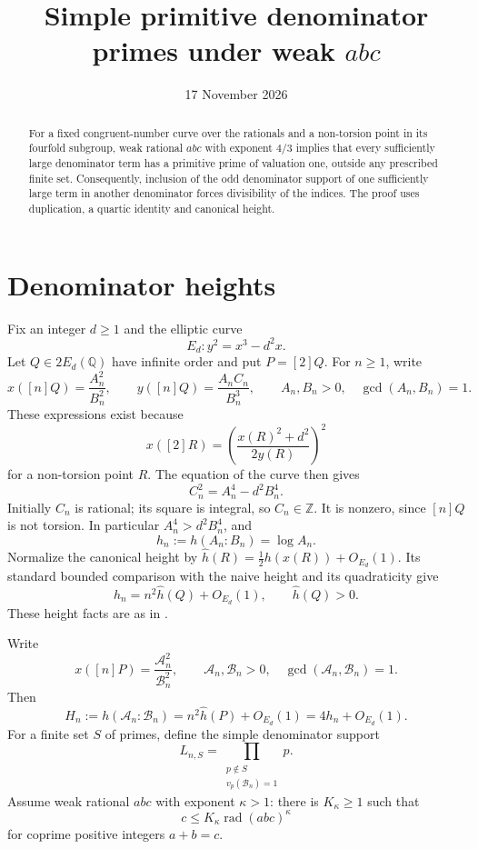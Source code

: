 \documentclass[11pt,a4paper]{article}
\title{Simple primitive denominator primes under weak \texorpdfstring{$abc$}{abc}}
\author{}\date{17 November 2026}
\newcommand{\Q}{\mathbb Q}\newcommand{\Z}{\mathbb Z}
\DeclareMathOperator{\rad}{rad}
\begin{document}
\maketitle

\begin{abstract}
For a fixed congruent-number curve over the rationals and a non-torsion
point in its fourfold subgroup, weak rational $abc$ with exponent $4/3$
implies that every sufficiently large denominator term has a primitive
prime of valuation one, outside any prescribed finite set.
Consequently, inclusion of the odd denominator support of one sufficiently
large term in another denominator forces divisibility of the indices.
The proof uses duplication, a quartic identity and canonical height.
\end{abstract}

\section{Denominator heights}

Fix an integer $d\ge1$ and the elliptic curve
\[
                       E_d:y^2=x^3-d^2x.
\]
Let $Q\in2E_d(\Q)$ have infinite order and put $P=[2]Q$.
For $n\ge1$, write
\begin{equation}\label{eq:coordinates}
 x([n]Q)=\frac{A_n^2}{B_n^2},\qquad
 y([n]Q)=\frac{A_n C_n}{B_n^3},\qquad
 A_n,B_n>0,\quad\gcd(A_n,B_n)=1.
\end{equation}
These expressions exist because
\[
 x([2]R)=\left(\frac{x(R)^2+d^2}{2y(R)}\right)^2
\]
for a non-torsion point $R$. The equation of the curve then gives
\begin{equation}\label{eq:quartic}
                         C_n^2=A_n^4-d^2B_n^4.
\end{equation}
Initially $C_n$ is rational; its square is integral, so $C_n\in\Z$.
It is nonzero, since $[n]Q$ is not torsion. In particular
$A_n^4>d^2B_n^4$, and
\[
                  h_n:=h(A_n:B_n)=\log A_n.
\]
Normalize the canonical height by
$\widehat h(R)=\tfrac12h(x(R))+O_{E_d}(1)$. Its standard bounded
comparison with the naive height and its quadraticity give
\begin{equation}\label{eq:canonical}
              h_n=n^2\widehat h(Q)+O_{E_d}(1),\qquad
                         \widehat h(Q)>0.
\end{equation}
These height facts are as in \cite[Chapter VIII, Section 9]{AEC}.

Write
\[
 x([n]P)=\frac{\mathcal A_n^2}{\mathcal B_n^2},\qquad
 \mathcal A_n,\mathcal B_n>0,\quad
 \gcd(\mathcal A_n,\mathcal B_n)=1.
\]
Then
\begin{equation}\label{eq:height-double}
 H_n:=h(\mathcal A_n:\mathcal B_n)
    =n^2\widehat h(P)+O_{E_d}(1)=4h_n+O_{E_d}(1).
\end{equation}
For a finite set $S$ of primes, define the simple denominator support
\[
                 L_{n,S}=\prod_{\substack{p\notin S\\v_p(\mathcal B_n)=1}}p.
\]
Assume weak rational $abc$ with exponent $\kappa>1$: there is
$K_\kappa\ge1$ such that
\[
 c\le K_\kappa\rad(abc)^\kappa
\]
for coprime positive integers $a+b=c$.
\end{document}
